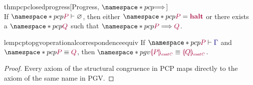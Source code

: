 \begin{restatabletheorem}{thmpcpclosedprogress}[Progress, $\pcp{\red}$]
  \label{thm:pcp-closed-progress}
  \hfill\\%
  If $\pcp{\seq{P}{\emptyenv}}$, then either $\pcp{\tm{P}=\tm{\halt}}$ or there exists a $\pcp{\tm{Q}}$ such that $\pcp{\tm{P}\red\tm{Q}}$.
\end{restatabletheorem}

\endgroup

\begingroup
{}








\begin{restatablelemma}{lempcptopgvoperationalcorrespondenceequiv}%
  \label{lem:pcp-to-pgv-confs-operational-correspondence-equiv}
  If $\pcp{\seq{P}{\ty{\Gamma}}}$ and $\pcp{\tm{P}\equiv\tm{Q}}$,
  then $\pgv{\tm{\cpgvC{P}}\equiv\tm{\cpgvC{Q}}}$.
\end{restatablelemma}
\begin{proof}
  Every axiom of the structural congruence in PCP maps directly to the axiom of the same name in PGV.
\end{proof}


\endgroup


